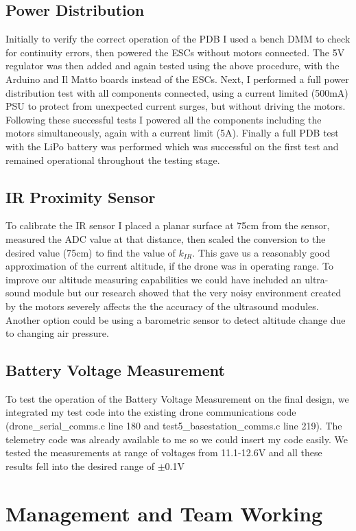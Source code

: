 \documentclass[a4paper,11pt]{article}
\begin{document}
\subsection{Power Distribution}
 Initially to verify the correct operation of the PDB I used a bench DMM to check for continuity errors, then powered the ESCs without motors connected. The 5V regulator was then added and again tested using the above procedure, with the Arduino and Il Matto boards instead of the ESCs. Next, I performed a full power distribution test with all components connected, using a current limited (500mA) PSU to protect from unexpected current surges, but without driving the motors. Following these successful tests I powered all the components including the motors simultaneously, again with a current limit (5A). Finally a full PDB test with the LiPo battery was performed which was successful on the first test and remained operational throughout the testing stage.
 
\subsection{IR Proximity Sensor}
To calibrate the IR sensor I placed a planar surface at 75cm from the sensor, measured the ADC value at that distance, then scaled the conversion to the desired value (75cm) to find the value of $k_{IR}$. This gave us a reasonably good approximation of the current altitude, if the drone was in operating range. To improve our altitude measuring capabilities we could have included an ultra-sound module but our research showed that the very noisy environment created by the motors severely affects the the accuracy of the ultrasound modules. Another option could be using a barometric sensor to detect altitude change due to changing air pressure. 

\subsection{Battery Voltage Measurement}
To test the operation of the Battery Voltage Measurement on the final design, we integrated my test code into the existing drone communications code (drone\_serial\_comms.c line 180 and test5\_basestation\_comms.c line 219). The telemetry code was already available to me so we could insert my code easily. We tested the measurements at range of voltages from 11.1-12.6V and all these results fell into the desired range of $\pm$0.1V

\section{Management and Team Working}
\end{document}

